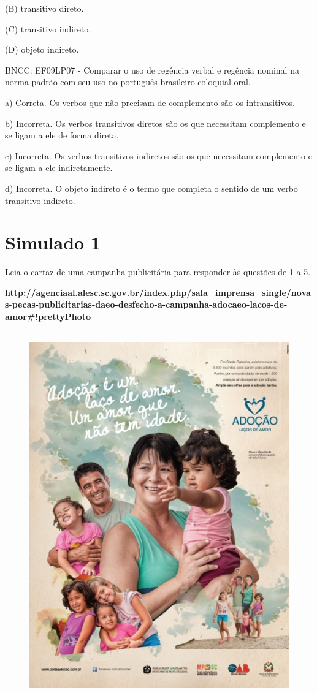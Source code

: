 \begin{itemize}
\begin{itemize}
{\begin{itemize}
\begin{itemize}
(B) transitivo direto.

(C) transitivo indireto.

(D) objeto indireto.

BNCC: EF09LP07 - Comparar o uso de regência verbal e regência nominal na
norma-padrão com seu uso no português brasileiro coloquial oral.

a) Correta. Os verbos que não precisam de complemento são os
intransitivos.

b) Incorreta. Os verbos transitivos diretos são os que necessitam
complemento e se ligam a ele de forma direta.

c) Incorreta. Os verbos transitivos indiretos são os que necessitam
complemento e se ligam a ele indiretamente.

d) Incorreta. O objeto indireto é o termo que completa o sentido de um
verbo transitivo indireto.

\chapter{Simulado 1}

Leia o cartaz de uma campanha publicitária para responder às questões de
1 a 5.

\textbf{http://agenciaal.alesc.sc.gov.br/index.php/sala\_imprensa\_single/novas-pecas-publicitarias-daeo-desfecho-a-campanha-adocaeo-lacos-de-amor\#!prettyPhoto}

\begin{figure}
\centering
\includegraphics[width=4.68750in,height=6.25000in]{./_SAEB_9_POR/media/image33.jpeg}
\caption{}
\end{figure}


\end{itemize}
\end{itemize}}
\end{itemize}
\end{itemize}

